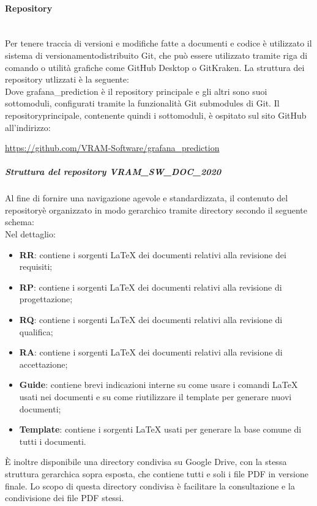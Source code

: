 	\paragraph{Repository}\mbox{}\\ [1mm]
		Per tenere traccia di versioni e modifiche fatte a documenti e codice è utilizzato il sistema di versionamento\glosp distribuito Git, che può essere utilizzato tramite riga di comando o utilità grafiche come GitHub Desktop o GitKraken.
		La struttura dei repository utlizzati è la seguente:
		\newline
		\mbox{}\\ %
		Dove grafana\_prediction è il repository principale e gli altri sono suoi sottomoduli, configurati tramite la funzionalità Git submodules di Git.
		Il repository\glosp principale, contenente quindi i sottomoduli, è ospitato sul sito GitHub all'indirizzo: 
		\begin{center}
			\url{https://github.com/VRAM-Software/grafana_prediction}
		\end{center}
		\subparagraph{Struttura del repository VRAM\_SW\_DOC\_2020}
		Al fine di fornire una navigazione agevole e standardizzata, il contenuto del repository\glosp è organizzato in modo gerarchico tramite directory secondo il seguente schema:
		\newline
		\mbox{}\\ %
		Nel dettaglio:
		\begin{itemize}
			\item \textbf{RR}: contiene i sorgenti \LaTeX \xspace dei documenti relativi alla revisione dei requisiti;
			\item \textbf{RP}: contiene i sorgenti \LaTeX \xspace dei documenti relativi alla revisione di progettazione\glo;
			\item \textbf{RQ}: contiene i sorgenti \LaTeX \xspace dei documenti relativi alla revisione di qualifica;
			\item \textbf{RA}: contiene i sorgenti \LaTeX \xspace dei documenti relativi alla revisione di accettazione; 
			\item \textbf{Guide}: contiene brevi indicazioni interne su come usare i comandi \LaTeX \xspace usati nei documenti e su come riutilizzare il template per generare nuovi documenti;
			\item \textbf{Template}: contiene i sorgenti \LaTeX \xspace usati per generare la base comune di tutti i documenti.
		\end{itemize}
		È inoltre disponibile una directory condivisa su Google Drive, con la stessa struttura gerarchica sopra esposta, che contiene tutti e soli i file PDF in versione finale. Lo scopo di questa directory condivisa è facilitare la consultazione e la condivisione dei file PDF stessi.
		
